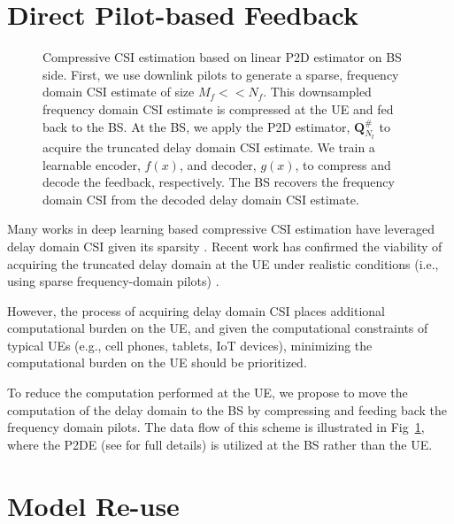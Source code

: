 \section{Direct Pilot-based Feedback} \label{sect:direct_pilots}

\begin{figure}[!hbtp]
    \centering
    {
      \fontsize{8pt}{8pt}
      \def\svgwidth{1.0\linewidth}
      
    }
    \caption{Compressive CSI estimation based on linear P2D estimator on BS side. First,
    we use downlink pilots to 
    generate a sparse, frequency domain CSI
    estimate 
    of size $M_f << N_f$. This downsampled frequency domain CSI estimate is compressed at the UE
    and fed back to the BS.
    At the BS, we apply
    the P2D estimator, $\mathbf{Q}^{\#}_{N_t}$ \cite{ref:delRosario2022p2d} to acquire 
    the truncated
    delay domain CSI estimate.
    We train a
    learnable encoder, 
    $f(x)$,
    and decoder, $g(x)$, to compress and decode the feedback, respectively. The 
    BS recovers
    the frequency domain
    CSI from 
    the decoded 
    delay domain CSI estimate.}
    \label{fig:p2d_direct}
\end{figure}

Many works in deep learning based compressive CSI estimation 
have leveraged delay domain CSI given its sparsity \cite{ref:csinet}.
Recent work has confirmed the viability of acquiring the truncated delay domain 
at the UE under realistic conditions (i.e., using sparse frequency-domain pilots) \cite{ref:delRosario2022p2d}.

However, the process of acquiring delay domain CSI places additional 
computational burden on the UE, and given the computational constraints
of typical UEs (e.g., cell phones, tablets, IoT devices), minimizing the 
computational burden on the UE should be prioritized.

To reduce the computation performed at the UE, we propose to move the computation of 
the delay domain to the BS by compressing and feeding back the frequency domain pilots.
The data flow of this scheme is illustrated in Fig~\ref{fig:p2d_direct}, where the 
P2DE (see \cite{ref:delRosario2022p2d} for full details) is utilized at the 
BS rather than the UE.

\section{Model Re-use} \label{sect:model_reuse}

